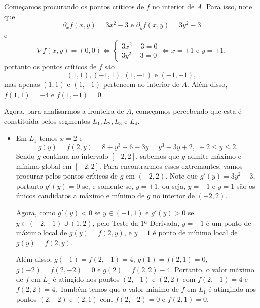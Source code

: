 \begin{example}
    Começamos procurando os pontos críticos de \(f\) no interior de \(A\). Para isso, note que \[\partial_x f(x,y) = 3x^2 - 3 \text{ e } \partial_y f(x,y) = 3y^2 - 3\] e \[\nabla f(x,y) = (0,0) \Leftrightarrow \begin{cases}
        3x^2 - 3 = 0 \\
        3y^2 - 3 = 0
    \end{cases} \Leftrightarrow x = \pm 1 \text{ e } y = \pm 1,\] portanto os pontos críticos de \(f\) são \[(1,1), (-1,1), (1,-1) \text{ e } (-1,-1),\] mas apenas \((1,1)\) e \((1,-1)\) pertencem ao interior de \(A\). Além disso, \(f(1,1) = -4\) e \(f(1,-1) = 0\).

    Agora, para analisarmos a fronteira de \(A\), começamos percebendo que esta é constituida pelos segmentos \(L_1, L_2, L_3\) e \(L_4\).
        \begin{itemize}
            \item Em \(L_1\) temos \(x=2\) e \[g(y) = f(2,y) = 8 + y^3 - 6 - 3y = y^3 -3y + 2,\; -2\leq y\leq 2.\] Sendo \(g\) contínua no intervalo \([-2,2]\), sabemos que \(g\) admite máximo e mínimo global em \([-2,2]\). Para encontrarmos esses extremantes, vamos procurar pelos pontos críticos de \(g\) em \((-2,2)\). Note que \(g'(y) = 3y^2 - 3\), portanto \(g'(y) = 0\) se, e somente se, \(y = \pm 1\), ou seja, \(y=-1\) e \(y=1\) são os únicos candidatos a máximo e mínimo de \(g\) no interior de \((-2,2)\). 
            
            Agora, como \(g'(y) < 0\) se \(y\in(-1,1)\) e \(g'(y) > 0\) se \(y\in(-2,-1)\cup(1,2)\), pelo Teste da 1ª Derivada, \(y=-1\) é um ponto de máximo local de \(g(y) = f(2,y)\), e \(y=1\) é ponto de mínimo local de \(g(y) = f(2,y)\). 
            
            Além disso, \(g(-1) = f(2,-1) = 4\), \(g(1) = f(2,1) = 0\), \(g(-2) = f(2,-2) = 0\) e \(g(2) = f(2,2) - 4\). Portanto, o valor máximo de \(f\) em \(L_1\) é atingido nos pontos \((2,-1)\) e \((2,2)\) com \(f(2,-1) = 4\) e \(f(2,2) = 4\). Também temos que o valor mínimo de \(f\) em \(L_1\) é atingindo nos pontos \((2,-2)\) e \((2,1)\) com \(f(2,-2) = 0\) e \(f(2,1) = 0\).


\end{itemize}
\end{example}
